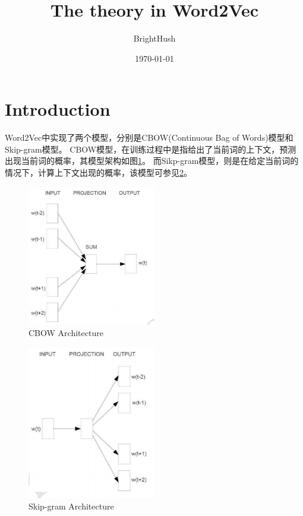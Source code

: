 \documentclass[UTF8]{ctexart}
\title{The theory in Word2Vec}
\author{BrightHush}
\date{\today}
\begin{document}
\maketitle
\tableofcontents

\pagestyle{fancy}
\cfoot{\thepage}

\newcommand{\figref}[1]{\figurename~\ref{#1}}

\section{Introduction}
Word2Vec中实现了两个模型，分别是CBOW(Continuous Bag of Words)模型和Skip-gram模型。
CBOW模型，在训练过程中是指给出了当前词的上下文，预测出现当前词的概率，其模型架构如图\ref{Fig:CBOW}。
而Sikp-gram模型，则是在给定当前词的情况下，计算上下文出现的概率，该模型可参见\ref{Fig:skipgram}。
\begin{figure}[h!]
    \centering     
    \includegraphics[width=0.5\textwidth]{cbow}   
    \caption{\label{Fig:CBOW}CBOW Architecture} 
\end{figure}

\begin{figure}[h!]
    \centering     
    \includegraphics[width=0.5\textwidth]{skipgram}   
    \caption{\label{Fig:skipgram}Skip-gram Architecture} 
\end{figure}
\end{document}
